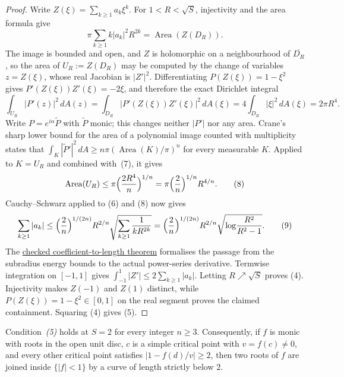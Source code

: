\begin{proof}
Write $Z(\xi)=\sum_{k\ge1}a_k\xi^k$.  For
$1<R<\sqrt S$, injectivity and the area formula give
\[
 \pi\sum_{k\ge1}k|a_k|^2R^{2k}
   =\operatorname{Area}(Z(D_R)).                    \tag{6}
\]
The image is bounded and open, and $Z$ is holomorphic on a neighbourhood of
$\overline{D_R}$, so the area of $U_R:=Z(D_R)$ may be computed by the change
of variables $z=Z(\xi)$, whose real Jacobian is $|Z'|^2$.  Differentiating
$P(Z(\xi))=1-\xi^2$ gives $P'(Z(\xi))Z'(\xi)=-2\xi$, and therefore the exact
Dirichlet integral
\[
 \int_{U_R}|P'(z)|^2\,dA(z)
 =\int_{D_R}\bigl|P'(Z(\xi))Z'(\xi)\bigr|^2\,dA(\xi)
 =4\int_{D_R}|\xi|^2\,dA(\xi)=2\pi R^4.            \tag{7}
\]
Write $P=e^{i\alpha}\widetilde P$ with $\widetilde P$ monic; this changes
neither $|P'|$ nor any area.  Crane's sharp lower bound for the area of a
polynomial image counted with multiplicity \cite[Theorem~3]{crane} states that
$\int_K|\widetilde P'|^2\,dA\ge n\pi(\operatorname{Area}(K)/\pi)^n$ for every
measurable $K$.  Applied to $K=U_R$ and combined with~(7), it gives
\[
 \operatorname{Area}(U_R)
 \le \pi\Bigl(\frac{2R^4}{n}\Bigr)^{1/n}
 = \pi\Bigl(\frac2n\Bigr)^{1/n}R^{4/n}.            \tag{8}
\]
Cauchy--Schwarz applied to (6) and (8) now gives
\[
 \sum_{k\ge1}|a_k|
 \le \Bigl(\frac2n\Bigr)^{1/(2n)}R^{2/n}
      \sqrt{\sum_{k\ge1}\frac1{kR^{2k}}}
 = \Bigl(\frac2n\Bigr)^{1/(2n)}R^{2/n}
   \sqrt{\log\!\frac{R^2}{R^2-1}}.                  \tag{9}
\]
The \href{https://github.com/wcook04/plectis-erdos/blob/0d34630e1cc9d2b1ac6edfa7cfdba83b31bdc8fe/ErdosProblems/Erdos1041/PowerSeriesDerivative.lean#L120}{checked coefficient-to-length theorem} formalises the passage from the subradius energy bounds to the actual power-series derivative. Termwise integration on $[-1,1]$ gives
$\int_{-1}^{1}|Z'|\le2\sum_{k\ge1}|a_k|$.  Letting
$R\nearrow\sqrt S$ proves (4).  Injectivity makes $Z(-1)$ and $Z(1)$
distinct, while $P(Z(\xi))=1-\xi^2\in[0,1]$ on the real segment proves the
claimed containment.  Squaring (4) gives (5).
\end{proof}

\begin{corollary}
\label{res:critical-value-thresholds}
Condition~\emph{(5)} holds at $S=2$ for every integer $n\ge3$.
Consequently, if $f$ is monic with roots in the open unit disc, $c$ is a
simple critical point with $v=f(c)\ne0$, and every other critical point
satisfies $|1-f(d)/v|\ge2$, then two roots of $f$ are joined inside
$\{|f|<1\}$ by a curve of length strictly below $2$.
\end{corollary}

